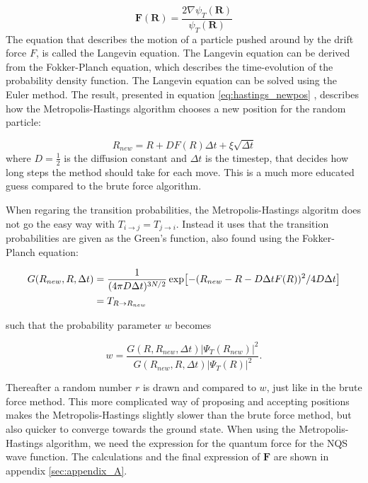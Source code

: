 \documentclass[norsk,a4paper,12pt]{article}
\begin{document}
\begin{equation}
\label{eq:drift_force}
\boldsymbol{F}(\boldsymbol{R}) = \frac{2 \nabla \psi_T(\boldsymbol{R})}{\psi_T(\boldsymbol{R})}
\end{equation}
The equation that describes the motion of a particle pushed around by the drift force $F$, is called the Langevin equation. The Langevin equation can be derived from the Fokker-Planch equation, which describes the time-evolution of the probability density function. The Langevin equation can be solved using the Euler method. The result, presented in equation \ref{eq:hastings_newpos} , describes how the Metropolis-Hastings algorithm chooses a new position for the random particle:

\begin{equation}
\label{eq:hastings_newpos}
R_{new} = R + DF(R)\Delta t + \xi\sqrt{\Delta t}
\end{equation}
where $D=\frac{1}{2}$ is the diffusion constant and $\Delta t$ is the timestep, that decides how long steps the method should take for each move. This is a much more educated guess compared to the brute force algorithm. 
\par 
\vspace{3mm}
When regaring the transition probabilities, the Metropolis-Hastings algoritm does not go the easy way with $T_{i\rightarrow j} = T_{j\rightarrow i}$.  Instead it uses that the transition probabilities are given as the Green's function, also found using the Fokker-Planch equation:

\begin{align}
G(R_{new},R,\Delta t)&=\frac{1}{(4\pi D\Delta t)^{3N/2}}\exp[-(R_{new} - R - D\Delta tF(R))^2/4D\Delta t]\notag\\
&=T_{R\rightarrow R_{new}}
\end{align}

such that the probability parameter $w$ becomes 

\begin{equation}
w = \frac{G(R,R_{new},\Delta t)|\Psi_T(R_{new})|^2}{G(R_{new},R,\Delta t)|\Psi_T(R)|^2}.
\end{equation}

Thereafter a random number $r$ is drawn and compared to $w$, just like in the brute force method. This more complicated way of proposing and accepting positions makes the Metropolis-Hastings slightly slower than the brute force method, but also quicker to converge towards the ground state. When using the Metropolis-Hastings algorithm, we need the expression for the quantum force for the NQS wave function. The calculations and the final expression of $\boldsymbol{F}$ are shown in appendix \ref{sec:appendix_A}.
\par 
\vspace{3mm}
\end{document}
